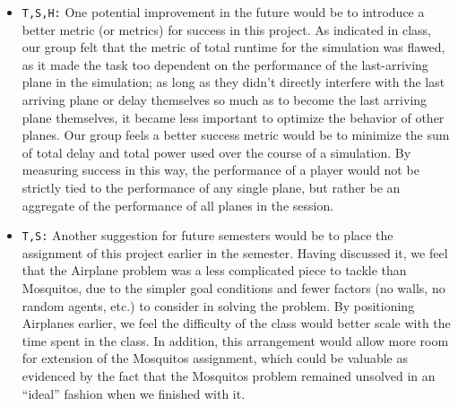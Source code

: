 \documentclass[10pt]{article}
\newcommand{\ms}[1] {
  \texttt{#1}
}
\begin{document}
\begin{itemize}
\item \ms{T,S,H:}One potential improvement in the future would be to introduce a better metric (or metrics) for success
in this project. As indicated in class, our group felt that the metric of total runtime for the simulation
was flawed, as it made the task too dependent on the performance of the last-arriving plane in the simulation;
as long as they didn't directly interfere with the last arriving plane or delay themselves so much
as to become the last arriving plane themselves, it became less important to optimize the behavior
of other planes. Our group feels a better success metric would be to minimize the sum of total delay and 
total power used over the course of a simulation. By measuring success in this way, the performance of a player
would not be strictly tied to the performance of any single plane, but rather be an aggregate of the performance
of all planes in the session. 

\item \ms{T,S:} Another suggestion for future semesters would be to place the assignment of this project earlier in the 
semester. Having discussed it, we feel that the Airplane problem was a less complicated piece to tackle than Mosquitos, 
due to the simpler goal conditions and fewer factors (no walls, no random agents, etc.) to consider in solving the problem.
By positioning Airplanes earlier, we feel the difficulty of the class would better scale with the time spent in the class. 
In addition, this arrangement would allow more room for extension of the Mosquitos assignment, which could be valuable as 
evidenced by the fact that the Mosquitos problem remained unsolved in an ``ideal'' fashion when we finished with it.


\end{itemize}
  
\end{document}
